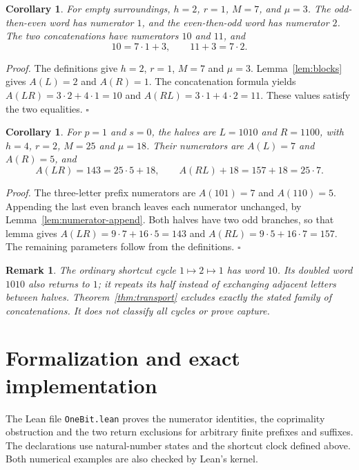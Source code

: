 \documentclass[11pt,letterpaper]{article}
\newtheorem{corollary}[theorem]{Corollary}
\newtheorem{remark}[theorem]{Remark}
\newenvironment{proof}{\noindent\textit{Proof.}}{\hfill\(\square\)}
\begin{document}
\begin{corollary}
\label{cor:empty}
For empty surroundings, \(h=2\), \(r=1\), \(M=7\), and \(\mu=3\). The odd-then-even word has numerator \(1\), and the even-then-odd word has numerator \(2\). The two concatenations have numerators \(10\) and \(11\), and
\[
10=7\cdot 1+3,\qquad 11+3=7\cdot 2.
\]
\end{corollary}

\begin{proof}
The definitions give \(h=2\), \(r=1\), \(M=7\) and \(\mu=3\).
Lemma~\ref{lem:blocks} gives \(A(L)=2\) and \(A(R)=1\). The concatenation
formula yields \(A(LR)=3\cdot2+4\cdot1=10\) and
\(A(RL)=3\cdot1+4\cdot2=11\). These values satisfy the two equalities.
\end{proof}

\begin{corollary}
For \(p=1\) and \(s=0\), the halves are \(L=1010\) and \(R=1100\),
with \(h=4\), \(r=2\), \(M=25\) and \(\mu=18\). Their numerators are
\(A(L)=7\) and \(A(R)=5\), and
\[
A(LR)=143=25\cdot5+18,\qquad A(RL)+18=157+18=25\cdot7.
\]
\end{corollary}

\begin{proof}
The three-letter prefix numerators are \(A(101)=7\) and \(A(110)=5\).
Appending the last even branch leaves each numerator unchanged, by
Lemma~\ref{lem:numerator-append}. Both halves have two odd branches, so
that lemma gives \(A(LR)=9\cdot7+16\cdot5=143\) and
\(A(RL)=9\cdot5+16\cdot7=157\). The remaining parameters follow from
the definitions.
\end{proof}

\begin{remark}
The ordinary shortcut cycle \(1\mapsto2\mapsto1\) has word \(10\).
Its doubled word \(1010\) also returns to \(1\); it repeats its half
instead of exchanging adjacent letters between halves. Theorem~\ref{thm:transport}
excludes exactly the stated family of concatenations. It does not classify
all cycles or prove capture.
\end{remark}

\section{Formalization and exact implementation}

The Lean file \texttt{OneBit.lean} proves the numerator identities, the
coprimality obstruction and the two return exclusions for arbitrary finite
prefixes and suffixes. The declarations use natural-number states and the
shortcut clock defined above. Both numerical examples are also checked by
Lean's kernel.
\end{document}
